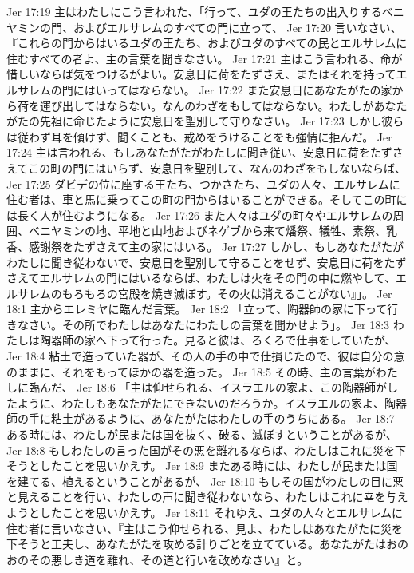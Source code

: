 Jer 17:19  主はわたしにこう言われた、「行って、ユダの王たちの出入りするベニヤミンの門、およびエルサレムのすべての門に立って、
Jer 17:20  言いなさい、『これらの門からはいるユダの王たち、およびユダのすべての民とエルサレムに住むすべての者よ、主の言葉を聞きなさい。
Jer 17:21  主はこう言われる、命が惜しいならば気をつけるがよい。安息日に荷をたずさえ、またはそれを持ってエルサレムの門にはいってはならない。
Jer 17:22  また安息日にあなたがたの家から荷を運び出してはならない。なんのわざをもしてはならない。わたしがあなたがたの先祖に命じたように安息日を聖別して守りなさい。
Jer 17:23  しかし彼らは従わず耳を傾けず、聞くことも、戒めをうけることをも強情に拒んだ。
Jer 17:24  主は言われる、もしあなたがたがわたしに聞き従い、安息日に荷をたずさえてこの町の門にはいらず、安息日を聖別して、なんのわざをもしないならば、
Jer 17:25  ダビデの位に座する王たち、つかさたち、ユダの人々、エルサレムに住む者は、車と馬に乗ってこの町の門からはいることができる。そしてこの町には長く人が住むようになる。
Jer 17:26  また人々はユダの町々やエルサレムの周囲、ベニヤミンの地、平地と山地およびネゲブから来て燔祭、犠牲、素祭、乳香、感謝祭をたずさえて主の家にはいる。
Jer 17:27  しかし、もしあなたがたがわたしに聞き従わないで、安息日を聖別して守ることをせず、安息日に荷をたずさえてエルサレムの門にはいるならば、わたしは火をその門の中に燃やして、エルサレムのもろもろの宮殿を焼き滅ぼす。その火は消えることがない』」。
Jer 18:1  主からエレミヤに臨んだ言葉。
Jer 18:2  「立って、陶器師の家に下って行きなさい。その所でわたしはあなたにわたしの言葉を聞かせよう」。
Jer 18:3  わたしは陶器師の家へ下って行った。見ると彼は、ろくろで仕事をしていたが、
Jer 18:4  粘土で造っていた器が、その人の手の中で仕損じたので、彼は自分の意のままに、それをもってほかの器を造った。
Jer 18:5  その時、主の言葉がわたしに臨んだ、
Jer 18:6  「主は仰せられる、イスラエルの家よ、この陶器師がしたように、わたしもあなたがたにできないのだろうか。イスラエルの家よ、陶器師の手に粘土があるように、あなたがたはわたしの手のうちにある。
Jer 18:7  ある時には、わたしが民または国を抜く、破る、滅ぼすということがあるが、
Jer 18:8  もしわたしの言った国がその悪を離れるならば、わたしはこれに災を下そうとしたことを思いかえす。
Jer 18:9  またある時には、わたしが民または国を建てる、植えるということがあるが、
Jer 18:10  もしその国がわたしの目に悪と見えることを行い、わたしの声に聞き従わないなら、わたしはこれに幸を与えようとしたことを思いかえす。
Jer 18:11  それゆえ、ユダの人々とエルサレムに住む者に言いなさい、『主はこう仰せられる、見よ、わたしはあなたがたに災を下そうと工夫し、あなたがたを攻める計りごとを立てている。あなたがたはおのおのその悪しき道を離れ、その道と行いを改めなさい』と。
